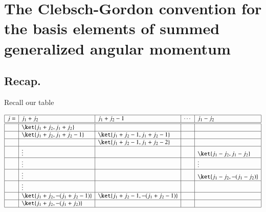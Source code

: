 %
%

\chapter{The Clebsch-Gordon convention for the basis elements of summed generalized angular momentum}
\label{chap:qmTwoL18}
{}
\date{Nov 12, 2011}

\beginArtWithToc

%
%
\section{Recap.}

Recall our table

\begin{equation}\label{eqn:qmTwoL18:10}
\begin{array}{| l | l | l | l | l |}
\hline
j = & j_1 + j_2				& j_1 + j_2 -1 				& \cdots 	& j_1 - j_2 \\
\hline
\hline
  &  \ket{j_1 + j_2, j_1 + j_2}	 	&					& 		& \\
\hline
  &  \ket{j_1 + j_2, j_1 + j_2 - 1}	&  \ket{j_1 + j_2 - 1, j_1 + j_2 - 1}	& 		& \\
\hline
  &                                     & \ket{j_1 + j_2 - 1, j_1 + j_2 - 2}	& 		& \\
\hline
  & \vdots 	 			&					& 		& \ket{j_1 - j_2, j_1 - j_2} \\
\hline
  & \vdots 	 			&					& 		& \vdots \\
\hline
  & \vdots 	 			&					& 		& \ket{j_1 - j_2, -(j_1 - j_2)} \\
\hline
  & \vdots 	 			&					& 		& \\
\hline
  &  \ket{j_1 + j_2, -(j_1 + j_2 - 1)}	& \ket{j_1 + j_2 -1, -(j_1 + j_2 - 1)}	& 		& \\
\hline
  &  \ket{j_1 + j_2, -(j_1 + j_2)}	&					& 		&  \\
\hline
\end{array}
\end{equation}

